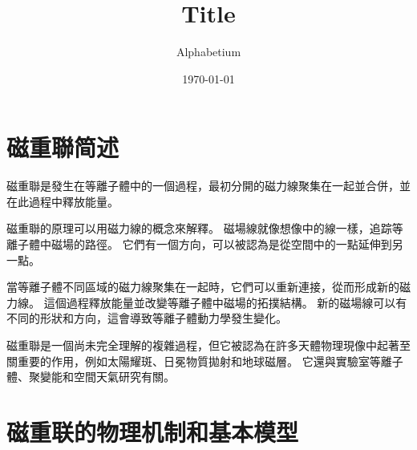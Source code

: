 \documentclass[12pt, a4paper, oneside]{article}
\title{Title}
\date{\today}
\author{Alphabetium}
\begin{document}
\begin{spacing}{2.0}
\tableofcontents
\maketitle


\section{磁重聯简述}

磁重聯是發生在等離子體中的一個過程，最初分開的磁力線聚集在一起並合併，並在此過程中釋放能量。

磁重聯的原理可以用磁力線的概念來解釋。 磁場線就像想像中的線一樣，追踪等離子體中磁場的路徑。 它們有一個方向，可以被認為是從空間中的一點延伸到另一點。

當等離子體不同區域的磁力線聚集在一起時，它們可以重新連接，從而形成新的磁力線。 這個過程釋放能量並改變等離子體中磁場的拓撲結構。 
新的磁場線可以有不同的形狀和方向，這會導致等離子體動力學發生變化。

磁重聯是一個尚未完全理解的複雜過程，但它被認為在許多天體物理現像中起著至關重要的作用，例如太陽耀斑、日冕物質拋射和地球磁層。 
它還與實驗室等離子體、聚變能和空間天氣研究有關。
\section{磁重联的物理机制和基本模型}

\end{spacing}
\end{document}
